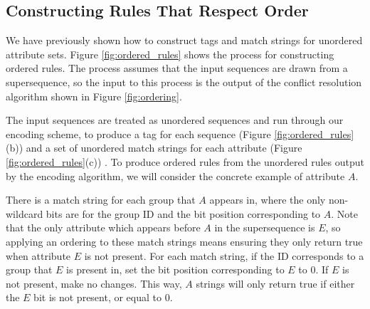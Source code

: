
\subsection{Constructing Rules That Respect Order}
\label{s:order-rules}

We have previously shown how to construct tags and match strings for unordered attribute sets. Figure \ref{fig:ordered_rules} shows the process for constructing ordered rules. The process assumes that the input sequences are drawn from a supersequence, so the input to this process is the output of the conflict resolution algorithm shown in Figure \ref{fig:ordering}.

The input sequences are treated as unordered sequences and run through our encoding scheme, to produce a tag for each sequence (Figure \ref{fig:ordered_rules}(b)) and a set of unordered match strings for each attribute (Figure \ref{fig:ordered_rules}(c)) . 
To produce ordered rules from the unordered rules output by the encoding algorithm, we will consider the concrete example of attribute $A$. 

There is a match string for each group that $A$ appears in, where the only non-wildcard bits are for the group ID and the bit position corresponding to $A$. Note that the only attribute which appears before $A$ in the supersequence is $E$, so applying an ordering to these match strings means ensuring they only return true when attribute $E$ is not present. 
 For each match string, if the ID corresponds to a group that $E$ is present in, set the bit position corresponding to $E$ to 0. If $E$ is not present, make no changes. This way, $A$ strings will only return true if either the $E$ bit is not present, or equal to 0. 

